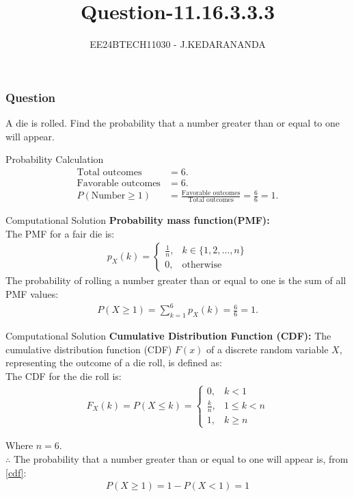 \documentclass{beamer}
\title{Question-11.16.3.3.3}
\author{EE24BTECH11030 - J.KEDARANANDA}
\date{}
\begin{document}
	
	\frame{\titlepage}
	
	\begin{frame}
		\frametitle{Question}
		A die is rolled. Find the probability that a number greater than or equal to one will appear.
	\end{frame}
	\begin{frame}{Probability Calculation}
		\begin{align}
			\text{Total outcomes} &= 6. \\
			\text{Favorable outcomes} &= 6. \\
			P(\text{Number} \geq 1) &= \frac{\text{Favorable outcomes}}{\text{Total outcomes}} = \frac{6}{6} = 1.
		\end{align}
	\end{frame}
	\begin{frame}{Computational Solution}
		\textbf{Probability mass function(PMF):}\\
		The PMF for a fair die is:
		\begin{align}
			p_{X}(k) =
			\begin{cases}
				\frac{1}{n}, & k \in \{1, 2,\dots ,n\} \\
				0, & \text{otherwise}
			\end{cases}
		\end{align}	
		The probability of rolling a number greater than or equal to one is the sum of all PMF values:
		\begin{align}
			P(X \geq 1) = \sum_{k=1}^{6} p_X(k) = \frac{6}{6} = 1.
		\end{align}
	\end{frame}
	\begin{frame}{Computational Solution}
		\textbf{Cumulative Distribution Function (CDF):}
		The cumulative distribution function (CDF) \(F(x)\) of a discrete random variable \(X\), representing the outcome of a die roll, is defined as: \\
		
		The CDF for the die roll is:
		\begin{align}
			F_X(k) = P(X \leq k) =
			\begin{cases}
				0, & k < 1 \\
				\frac{k}{n}, & 1 \leq k < n\\
				1, & k \geq n
			\end{cases} \label{cdf}
		\end{align}
		
		Where \( n = 6 \). \\ 
		$\therefore$ The probability that a number greater than or equal to one will appear is, from \eqref{cdf}:
		\begin{align}
			P(X \geq 1) = 1 - P(X < 1) = 1
		\end{align}
	\end{frame}
	
\end{document}
